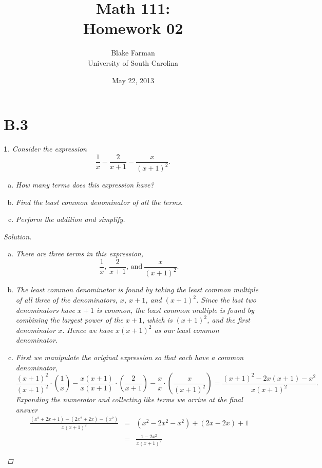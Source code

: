 \documentclass[12pt]{amsart}
\author{Blake Farman\\University of South Carolina}
\title{Math 111:\\Homework 02}%
\date{May 22, 2013}
\newtheorem{thm}{}
\begin{document}
\maketitle

\section*{B.3}

\setcounter{thm}{4} 
\begin{thm}
  Consider the expression
  $$\frac{1}{x} - \frac{2}{x + 1} - \frac{x}{(x+1)^2}.$$
  \begin{enumerate}[(a)]
  \item
    How many terms does this expression have?
  \item
    Find the least common denominator of all the terms.
  \item
    Perform the addition and simplify.
  \end{enumerate}
  \begin{proof}[Solution]
    \begin{enumerate}[(a)]
    \item
      There are three terms in this expression,
      $$\frac{1}{x},\, \frac{2}{x + 1},\, \text{and}\ \frac{x}{(x+1)^2}.$$
    \item
      The least common denominator is found by taking the least common multiple of all three of the denominators, $x$, $x+1$, and $(x+1)^2$.
      Since the last two denominators have $x+1$ is common, the least common multiple is found by combining the largest power of the $x+1$, which is $(x+1)^2$, and the first denominator $x$.
      Hence we have $x(x+1)^2$ as our least common denominator.
    \item
      First we manipulate the original expression so that each have a common denominator,
      $$\frac{(x+1)^2}{(x+1)^2} \cdot \left(\frac{1}{x}\right) - \frac{x(x+1)}{x(x+1)} \cdot \left(\frac{2}{x+1}\right) - \frac{x}{x} \cdot \left(\frac{x}{(x+1)^2}\right) = \frac{(x + 1)^2 - 2x(x+1) - x^2}{x(x+1)^2}.$$
      Expanding the numerator and collecting like terms we arrive at the final answer
      \begin{eqnarray*}
        \frac{(x^2 + 2x + 1) - (2x^2 + 2x) - (x^2)}{x(x+1)^2} &=& (x^2 - 2x^2 - x^2) + (2x - 2x) + 1\\
        &=& \frac{1 - 2x^2}{x(x+1)^2}
      \end{eqnarray*}
    \end{enumerate}
  \end{proof}
\end{thm}
\end{document}

